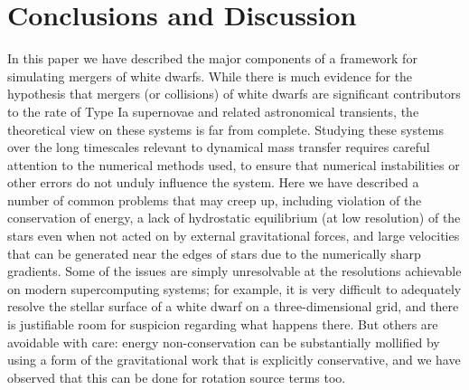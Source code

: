 \documentclass[iop]{emulateapj}
\begin{document}
\section{Conclusions and Discussion}\label{sec:Conclusions and Discussion}

In this paper we have described the major components of a framework for 
simulating mergers of white dwarfs. While there is much evidence for the 
hypothesis that mergers (or collisions) of white dwarfs are significant 
contributors to the rate of Type Ia supernovae and related astronomical 
transients, the theoretical view on these systems is far from complete. 
Studying these systems over the long timescales relevant to dynamical 
mass transfer requires careful attention to the numerical methods used, 
to ensure that numerical instabilities or other errors do not unduly 
influence the system. Here we have described a number of common problems
that may creep up, including violation of the conservation of energy, 
a lack of hydrostatic equilibrium (at low resolution) of the stars 
even when not acted on by external gravitational forces, and large 
velocities that can be generated near the edges of stars due to the 
numerically sharp gradients. Some of the issues are simply unresolvable
at the resolutions achievable on modern supercomputing systems; 
for example, it is very difficult to adequately resolve the stellar 
surface of a white dwarf on a three-dimensional grid, and there is 
justifiable room for suspicion regarding what happens there. But others
are avoidable with care: energy non-conservation can be substantially 
mollified by using a form of the gravitational work that is explicitly 
conservative, and we have observed that this can be done for rotation 
source terms too.
\end{document}
